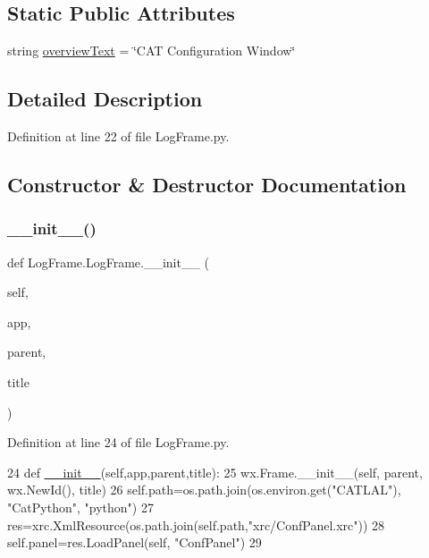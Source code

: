 \subsection*{Static Public Attributes}
\begin{DoxyCompactItemize}
\item 
string \hyperlink{classLogFrame_1_1LogFrame_a59c2a62bec07d62ee3db2615338443ae}{overview\+Text} = \char`\"{}C\+AT Configuration Window\char`\"{}
\end{DoxyCompactItemize}


\subsection{Detailed Description}


Definition at line 22 of file Log\+Frame.\+py.



\subsection{Constructor \& Destructor Documentation}
\mbox{\label{classLogFrame_1_1LogFrame_a756d5bc714b55aa93a21301a9986f8b1}} 
\subsubsection{\texorpdfstring{\+\_\+\+\_\+init\+\_\+\+\_\+()}{\_\_init\_\_()}}
{\footnotesize\ttfamily def Log\+Frame.\+Log\+Frame.\+\_\+\+\_\+init\+\_\+\+\_\+ (\begin{DoxyParamCaption}\item[{}]{self,  }\item[{}]{app,  }\item[{}]{parent,  }\item[{}]{title }\end{DoxyParamCaption})}



Definition at line 24 of file Log\+Frame.\+py.


\begin{DoxyCode}
24     \textcolor{keyword}{def }\hyperlink{classwrapper_1_1ModuleDictWrapper_a9a7a794150502f51df687831583e13b9}{\_\_init\_\_}(self,app,parent,title): 
25         wx.Frame.\_\_init\_\_(self, parent, wx.NewId(), title)
26         self.path=os.path.join(os.environ.get(\textcolor{stringliteral}{"CATLAL"}), \textcolor{stringliteral}{"CatPython"}, \textcolor{stringliteral}{"python"})
27         res=xrc.XmlResource(os.path.join(self.path,\textcolor{stringliteral}{"xrc/ConfPanel.xrc"}))
28         self.panel=res.LoadPanel(self, \textcolor{stringliteral}{"ConfPanel"})
29 
\end{DoxyCode}



